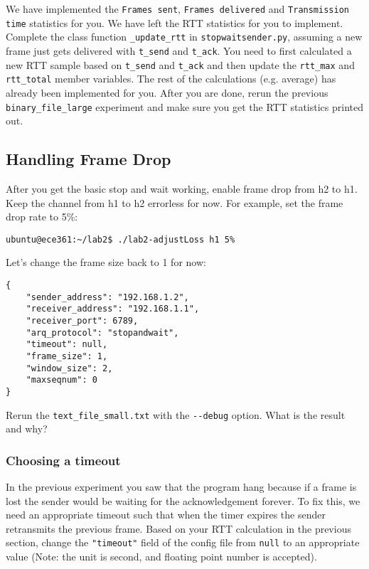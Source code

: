 \documentclass[11pt]{article}
\begin{document}
We have implemented the \texttt{Frames sent}, \texttt{Frames delivered} and \texttt{Transmission time} statistics for you.
We have left the RTT statistics for you to implement.
Complete the class function \texttt{\_update\_rtt} in \texttt{stopwaitsender.py}, assuming a new frame just gets delivered with \texttt{t\_send} and \texttt{t\_ack}.
You need to first calculated a new RTT sample based on \texttt{t\_send} and \texttt{t\_ack} and then update the \texttt{rtt\_max} and \texttt{rtt\_total} member variables.
The rest of the calculations (e.g. average) has already been implemented for you.
After you are done, rerun the previous \texttt{binary\_file\_large} experiment and make sure you get the RTT statistics printed out.

\subsection{Handling Frame Drop}
After you get the basic stop and wait working, enable frame drop from h2 to h1. Keep the channel from h1 to h2 errorless for now. For example, set the frame drop rate to 5\%:
\begin{lstlisting}[style=ece361-shell-base, caption={}]
ubuntu@ece361:~/lab2$ ./lab2-adjustLoss h1 5%
\end{lstlisting}
Let's change the frame size back to 1 for now:

\begin{lstlisting}[style=ece361-shell-base, caption={Configuration For Large File}]
{
    "sender_address": "192.168.1.2",
    "receiver_address": "192.168.1.1",
    "receiver_port": 6789,
    "arq_protocol": "stopandwait",
    "timeout": null,
    "frame_size": 1,
    "window_size": 2,
    "maxseqnum": 0
}
\end{lstlisting}

Rerun the \texttt{text\_file\_small.txt} with the \texttt{-{}-debug} option. What is the result and why?

\subsubsection {Choosing a timeout}
In the previous experiment you saw that the program hang because if a frame is lost the sender would be waiting for the acknowledgement forever.
To fix this, we need an appropriate timeout such that when the timer expires the sender retransmits the previous frame.
Based on your RTT calculation in the previous section, change the \texttt{"timeout"} field of the config file from \texttt{null} to an appropriate value (Note: the unit is second, and floating point number is accepted).
\end{document}
